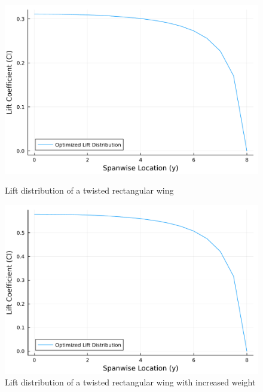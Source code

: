 \documentclass{article}
\begin{document}
\begin{figure}[h]
    \centering
\begin{minipage}[b]{0.45\textwidth}
\centering
\includegraphics[width=\textwidth]{Lift_Distribution_along_the_Span_Twist_Optimization.pdf}
\caption{Lift distribution of a twisted rectangular wing}
\label{fig:Optimized Twist Small Load}
\end{minipage}
\begin{minipage}[b]{0.45\textwidth}
\centering
\includegraphics[width=\textwidth]{Lift_Distribution_along_the_Span_Twist_Optimization_increased_lift.pdf}
\caption{Lift distribution of a twisted rectangular wing with increased weight}
\label{fig:Optimized Twist Large Load}
\end{minipage}
\end{figure}

%
%

\end{document}
